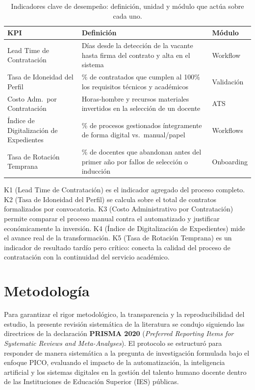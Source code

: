 \documentclass[conference]{IEEEtran}
\begin{document}
\begin{table}[t]
\centering
\caption{Indicadores clave de desempeño: definición, unidad y módulo que actúa sobre cada uno.}
\label{tab:kpi}
\begin{tabular}{p{2.55cm}p{3.6cm}p{1.5cm}}
    \toprule
    \textbf{KPI} & \textbf{Definición} & \textbf{Módulo} \\
    \midrule
    Lead Time de Contratación & Días desde la detección de la vacante hasta firma del contrato y alta en el sistema & Workflow \\
    \addlinespace
    Tasa de Idoneidad del Perfil & \% de contratados que cumplen al 100\% los requisitos técnicos y académicos & Validación \\
    \addlinespace
    Costo Adm.\ por Contratación & Horas-hombre y recursos materiales invertidos en la selección de un docente & ATS \\
    \addlinespace
    Índice de Digitalización de Expedientes & \% de procesos gestionados íntegramente de forma digital vs.\ manual/papel & Workflows \\
    \addlinespace
    Tasa de Rotación Temprana & \% de docentes que abandonan antes del primer año por fallos de selección o inducción & Onboarding \\
    \bottomrule
\end{tabular}
\end{table}

K1 (Lead Time de Contratación) es el indicador agregado del proceso completo. K2 (Tasa de Idoneidad del Perfil) se calcula sobre el total de contratos formalizados por convocatoria. K3 (Costo Administrativo por Contratación) permite comparar el proceso manual contra el automatizado y justificar económicamente la inversión. K4 (Índice de Digitalización de Expedientes) mide el avance real de la transformación. K5 (Tasa de Rotación Temprana) es un indicador de resultado tardío pero crítico: conecta la calidad del proceso de contratación con la continuidad del servicio académico.

\section{Metodología}

Para garantizar el rigor metodológico, la transparencia y la reproducibilidad del estudio, la presente revisión sistemática de la literatura se condujo siguiendo las directrices de la declaración \textbf{PRISMA 2020} (\textit{Preferred Reporting Items for Systematic Reviews and Meta-Analyses}). El protocolo se estructuró para responder de manera sistemática a la pregunta de investigación formulada bajo el enfoque PICO, evaluando el impacto de la automatización, la inteligencia artificial y los sistemas digitales en la gestión del talento humano docente dentro de las Instituciones de Educación Superior (IES) públicas.
\end{document}
